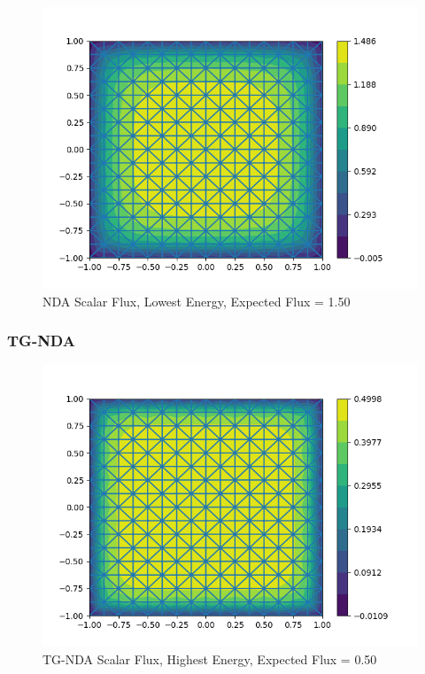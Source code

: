 \begin{figure}[H]
    \centering
    \includegraphics[width=\textwidth]{fig/nda_multi_group1.png}
    \caption{NDA Scalar Flux, Lowest Energy, Expected Flux = 1.50}
    \label{fig:nda_multi_g2}
\end{figure}

\subsubsection{TG-NDA}
\begin{figure}[H]
    \centering
    \includegraphics[width=\textwidth]{fig/tgnda_multi_group0.png}
    \caption{TG-NDA Scalar Flux, Highest Energy, Expected Flux = 0.50}
    \label{fig:tgnda_multi_g1}
\end{figure}

